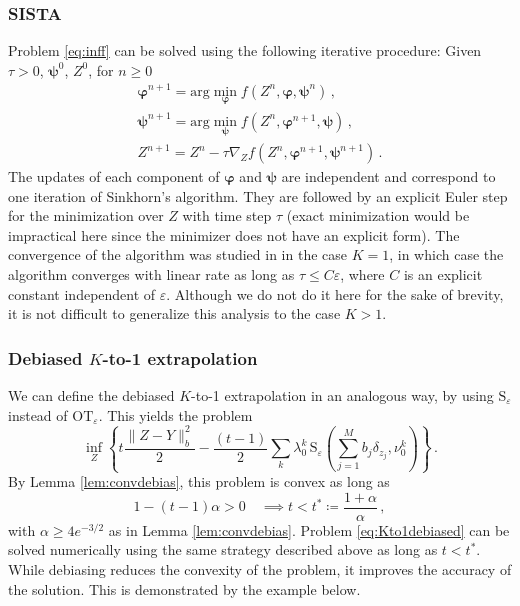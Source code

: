 \documentclass[12pt]{amsart}
\numberwithin{equation}{section}
\let\mr=\mathrm
\let\bs=\boldsymbol
\theoremstyle{plain}
\theoremstyle{definition}
\begin{document}
\subsubsection{SISTA}\label{sec:sista} Problem \eqref{eq:inff} can be solved using the following iterative procedure: Given $\tau>0$, $\bs{\psi}^0$, $Z^0$, for $n\geq 0$
\[\begin{array}{l}
\bs{\varphi}^{n+1} = \displaystyle \mr{arg} \min_{\bs{\varphi}} f(Z^n,\bs{\varphi},\bs{\psi}^n)\,,\\
\bs{\psi}^{n+1} =\displaystyle \mr{arg} \min_{\bs{\psi}} f(Z^n,\bs{\varphi}^{n+1},\bs{\psi})\,,\\
Z^{n+1} = Z^n - \tau \nabla_Z f(Z^n,\bs{\varphi}^{n+1},\bs{\psi}^{n+1})\,.
\end{array}
\]
The updates of each component of $\bs{\varphi}$ and $\bs{\psi}$ are independent and correspond to one iteration of Sinkhorn's algorithm. They are followed by an explicit Euler step for the minimization over $Z$ with time step $\tau$ (exact minimization would be impractical here since the minimizer does not have an explicit form). The convergence of the algorithm was studied in \cite{gallouet2025metric} in the case $K=1$, in which case the algorithm converges with linear rate as long as $\tau \leq C \varepsilon$, where $C$ is an explicit constant independent of $\varepsilon$. Although we do not do it here for the sake of brevity, it is not difficult to generalize this analysis to the case $K>1$.






\subsubsection{Debiased $K$-to-1 extrapolation}\label{sec:debkto1}
We can define the debiased $K$-to-1 extrapolation in an analogous way, by using $\mr{S}_\varepsilon$ instead of $\mr{OT}_\varepsilon$. This yields the problem
\begin{equation}\label{eq:Kto1debiased}
\inf_Z \left\{ t \frac{\|Z-Y\|^2_b}{2} -  \frac{(t-1)}2 \sum_k \lambda_0^k \,\mr{S}_\varepsilon \left(\sum_{j=1}^M b_j \delta_{z_j},\nu_0^k\right) \right\}\,.
\end{equation}
By Lemma \ref{lem:convdebias}, this problem is convex as long as
\begin{equation}\label{eq:tstar}
1 - (t-1)\alpha > 0\quad \implies t < t^* \coloneqq \frac{1+\alpha}{\alpha}\,,
\end{equation}
with $\alpha \geq 4 e^{-3/2}$ as in Lemma \ref{lem:convdebias}. Problem \eqref{eq:Kto1debiased} can be solved numerically using the same strategy described above as long as $t< t^*$. While debiasing reduces the convexity of the problem, it improves the accuracy of the solution. This is demonstrated by the example below.
\end{document}
